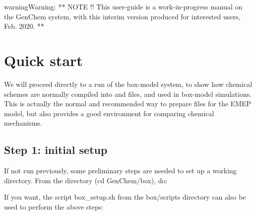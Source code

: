 \documentclass[a4paper,10pt,english]{sphinxmanual}
\begin{document}
\begin{sphinxadmonition}{warning}{Warning:}
**  NOTE !!
This user-guide is a work-in-progress manual on the GenChem system,
with this interim version produced for interested users, Feb. 2020.
**
\end{sphinxadmonition}


\chapter{Quick start}
\label{\detokenize{GenChemDoc_quickstart:quick-start}}\label{\detokenize{GenChemDoc_quickstart::doc}}
We will proceed directly to a run of the box-model system, to show how
chemical schemes are normally compiled into  and  files, and used
in box-model simulations. This is actually the normal and recommended way to
prepare files for the EMEP model, but also provides a good environment for
comparing chemical mechanisms.


\section{Step 1: initial setup}
\label{\detokenize{GenChemDoc_quickstart:step-1-initial-setup}}
If not run previously, some preliminary steps are needed to set up a
working directory.  From the  directory (cd
GenChem/box), do:

\begin{sphinxVerbatim}[commandchars=\\\{\}]
 
 

 

  
  
  
  
  
\end{sphinxVerbatim}

If you want, the script box\_setup.sh from the box/scripts directory can also be
used to perform the above steps:
\end{document}
